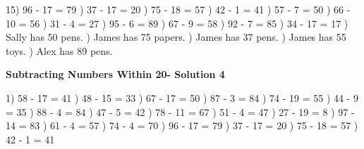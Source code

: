 \documentclass{article}%
\begin{document}
15) 96 {-} 17 = 79%
) 37 {-} 17 = 20%
) 75 {-} 18 = 57%
) 42 {-} 1 = 41%
) 57 {-} 7 = 50%
) 66 {-} 10 = 56%
) 31 {-} 4 = 27%
) 95 {-} 6 = 89%
) 67 {-} 9 = 58%
) 92 {-} 7 = 85%
) 34 {-} 17 = 17%
) Sally has 50 pens.%
) James has 75 papers.%
) James has 37 pens.%
) James has 55 toys.%
) Alex has 89 pens.%
\newline%
\newpage%
\large%
\begin{center}%
\textbf{Subtracting Numbers Within 20- Solution 4}%
\newline%
\end{center} \normalsize%
1) 58 {-} 17 = 41%
) 48 {-} 15 = 33%
) 67 {-} 17 = 50%
) 87 {-} 3 = 84%
) 74 {-} 19 = 55%
) 44 {-} 9 = 35%
) 88 {-} 4 = 84%
) 47 {-} 5 = 42%
) 78 {-} 11 = 67%
) 51 {-} 4 = 47%
) 27 {-} 19 = 8%
) 97 {-} 14 = 83%
) 61 {-} 4 = 57%
) 74 {-} 4 = 70%
) 96 {-} 17 = 79%
) 37 {-} 17 = 20%
) 75 {-} 18 = 57%
) 42 {-} 1 = 41%
\newline%
\end{document}
